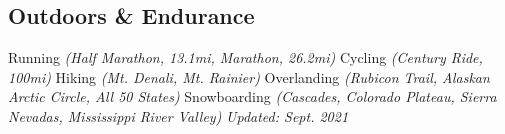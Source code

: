 \documentclass{article}
\begin{document}
    \subsection*{Outdoors \& Endurance}
        Running \textit{(Half Marathon, 13.1mi, Marathon, 26.2mi)}\newline
        Cycling \textit{(Century Ride, 100mi)}\newline
        Hiking \textit{(Mt. Denali, Mt. Rainier)}\newline
        Overlanding \textit{(Rubicon Trail, Alaskan Arctic Circle, All 50 States)}\newline
        Snowboarding \textit{(Cascades, Colorado Plateau, Sierra Nevadas, Mississippi River Valley)}\newline
        \mbox{}
        \vfill
        \hfill{}\textit{Updated: Sept. 2021}
\end{document}
